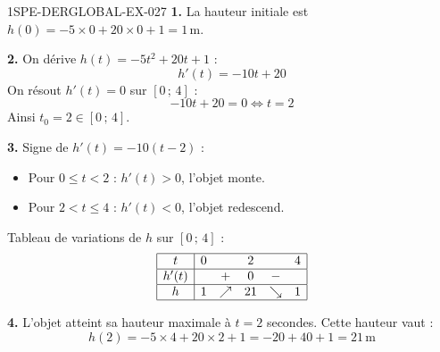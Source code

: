 \begin{corrige}{1SPE-DERGLOBAL-EX-027}
\textbf{1.} La hauteur initiale est $h(0) = -5 \times 0 + 20 \times 0 + 1 = \boxed{1\,\text{m}}$.

\textbf{2.} On dérive $h(t) = -5t^2 + 20t + 1$ :
\[
h'(t) = -10t + 20
\]
On résout $h'(t) = 0$ sur $[0\,;\,4]$ :
\[
-10t + 20 = 0 \iff t = 2
\]
Ainsi $t_0 = 2 \in [0\,;\,4]$.

\textbf{3.} Signe de $h'(t) = -10(t - 2)$ :
\begin{itemize}
\item Pour $0 \leqslant t < 2$ : $h'(t) > 0$, l'objet monte.
\item Pour $2 < t \leqslant 4$ : $h'(t) < 0$, l'objet redescend.
\end{itemize}

Tableau de variations de $h$ sur $[0\,;\,4]$ :
\[
\begin{array}{|c|ccccc|}
\hline
t & 0 & & 2 & & 4 \\
\hline
h'(t) & & + & 0 & - & \\
\hline
h & 1 & \nearrow & 21 & \searrow & 1 \\
\hline
\end{array}
\]

\textbf{4.} L'objet atteint sa hauteur maximale à $t = 2$ secondes. Cette hauteur vaut :
\[
h(2) = -5 \times 4 + 20 \times 2 + 1 = -20 + 40 + 1 = \boxed{21\,\text{m}}
\]
\end{corrige}
